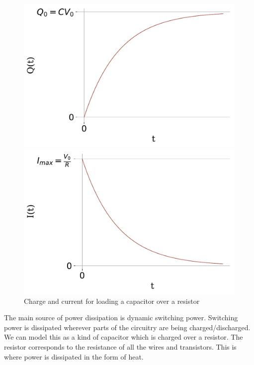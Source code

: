 \documentclass[12pt,a4paper]{article} %
\begin{document}
\begin{figure} [h]
	\centering	
	\begin{minipage}{0.5\textwidth}
		\centering
		\includegraphics[width=\textwidth]{Source/Charging/charge.pdf}
	\end{minipage}%
	\begin{minipage}{0.5\textwidth}
		\centering
		\includegraphics[width=\textwidth]{Source/Charging/current.pdf}
	\end{minipage}
	\caption{Charge and current for loading a capacitor over a resistor}%
	\label{fig-capacitorCharging}
\end{figure}%
The main source of power dissipation is dynamic switching power. Switching power is dissipated wherever parts of the circuitry are being charged/discharged. We can model this as a kind of capacitor which is charged over a resistor. The resistor corresponds to the resistance of all the wires and transistors. This is where power is dissipated in the form of heat. \\
\end{document}

